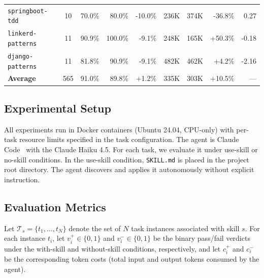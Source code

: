 \documentclass{article}
\begin{document}
\begin{table}[t]
{\begin{tabular}{l c r r r r r r r}
\midrule
  \texttt{springboot-tdd} & 10 & 70.0\% & 80.0\% & \cellcolor{red!15}-10.0\% & 236K & 374K & \cellcolor{green!10}-36.8\% & 0.27 \\
  \texttt{linkerd-patterns} & 11 & 90.9\% & 100.0\% & \cellcolor{red!15}-9.1\% & 248K & 165K & \cellcolor{red!10}+50.3\% & -0.18 \\
  \texttt{django-patterns} & 11 & 81.8\% & 90.9\% & \cellcolor{red!15}-9.1\% & 482K & 462K & +4.2\% & -2.16 \\
\midrule
  \textbf{Average} & 565 & 91.0\% & 89.8\% & +1.2\% & 335K & 303K & +10.5\% & --- \\
\bottomrule
\end{tabular}%
}
\end{table}

\subsection{Experimental Setup}

All experiments run in Docker containers (Ubuntu 24.04, CPU-only) with per-task resource limits specified in the task configuration. 
The agent is Claude Code~\cite{anthropic2025claudecode} with the Claude Haiku 4.5. 
For each task, we evaluate it under use-skill or no-skill conditions.
In the use-skill condition, \texttt{SKILL.md} is placed in the project root directory. 
The agent discovers and applies it autonomously without explicit instruction. 

\subsection{Evaluation Metrics}
Let $\mathcal{T}_s = \{t_1, \ldots, t_N\}$ denote the set of $N$ task instances associated with skill $s$. For each instance $t_i$, let $v_i^{+} \in \{0,1\}$ and $v_i^{-} \in \{0,1\}$ be the binary pass/fail verdicts under the with-skill and without-skill conditions, respectively, and let $c_i^{+}$ and $c_i^{-}$ be the corresponding token costs (total input and output tokens consumed by the agent).
\end{document}
